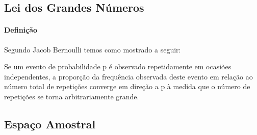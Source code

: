 \documentclass{article}
\begin{document}
        \subsection{Lei dos Grandes Números}
            \paragraph{Definição}Segundo Jacob Bernoulli temos como mostrado a seguir:
                \begin{displayquote}[][]
                    Se um evento de probabilidade p é observado repetidamente em ocasiões independentes, a proporção da frequência observada deste evento em relação ao número total de repetições converge em direção a p à medida que o número de repetições se torna arbitrariamente grande.
                \end{displayquote}

        \subsection{Espaço Amostral}
\end{document}
